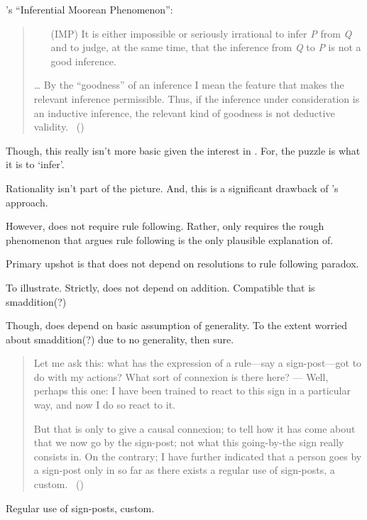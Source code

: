 \begin{note}
  \citeauthor{Hlobil:2014tq}'s ``Inferential Moorean Phenomenon'':
  \begin{quote}
    \begin{enumerate}
    \item[(IMP)]
      It is either impossible or seriously irrational to infer \emph{P} from \emph{Q} and to judge, at the same time, that the inference from \emph{Q} to \emph{P} is not a good inference.
    \end{enumerate}
    \dots
    By the ``goodness'' of an inference I mean the feature that makes the relevant inference permissible. Thus, if the inference under consideration is an inductive inference, the relevant kind of goodness is not deductive validity.%
    \mbox{ }\hfill\mbox{(\citeyear[\S1]{Hlobil:2014tq})}
  \end{quote}

  Though, this really isn't more basic given the interest in \tR{}.
  For, the puzzle is what it is to `infer'.

  Rationality isn't part of the picture.
  And, this is a significant drawback of \citeauthor{Hlobil:2014tq}'s approach.
\end{note}


\begin{note}
  However, \tR{} does not require rule following.
  Rather, \tR{} only requires the rough phenomenon that \citeauthor{Boghossian:2008vf} argues rule following is the only plausible explanation of.
\end{note}

\begin{note}
  Primary upshot is that \tR{} does not depend on resolutions to rule following paradox.

  To illustrate.
  Strictly, \tR{} does not depend on addition.
  Compatible that \tR{} is smaddition(?)

  Though, does depend on basic assumption of generality.
  To the extent worried about smaddition(?) due to no generality, then sure.
\end{note}

\begin{note}
  \begin{quote}
    Let me ask this: what has the expression of a rule—say a sign-post—got to do with my actions?
    What sort of connexion is there here?%
    ---%
    Well, perhaps this one:
    I have been trained to react to this sign in a particular way, and now I do so react to it.

    But that is only to give a causal connexion; to tell how it has come about that we now go by the sign-post; not what this going-by-the sign really consists in.
    On the contrary; I have further indicated that a person goes by a sign-post only in so far as there exists a regular use of sign-posts, a custom.%
    \mbox{ }\hfill\mbox{(\citeyear[\S198]{Wittgenstein:1958aa})}
  \end{quote}

  Regular use of sign-posts, custom.
\end{note}

